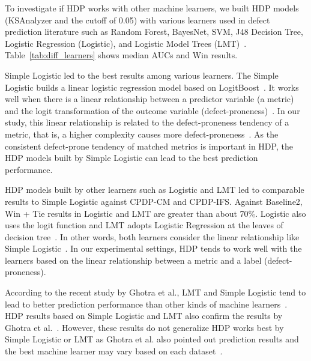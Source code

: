 To investigate if
HDP works with other machine learners, we built HDP models (KSAnalyzer and
the cutoff of 0.05) with various learners used in defect prediction
literature such as Random Forest, BayesNet, SVM, J48 Decision
Tree, Logistic Regression (Logistic),
and Logistic Model Trees
(LMT)~\cite{DAmbros12,Ghotra15,Lee11,Lessmann08,Nam13,Song11,Ghotra15}.
Table~\ref{tab:diff_learners} shows median AUCs and Win results.

Simple Logistic led to the best results among various
learners. The Simple Logistic builds a linear logistic regression model based on LogitBoost~\cite{Landwehr2005}. It works well when there is a linear
relationship between a predictor variable (a metric) and the logit
transformation of the outcome variable (defect-proneness)~\cite{Landwehr2005,Logstic}.
In our study, this linear relationship is related to the defect-proneness tendency of
a metric, that is, a higher complexity causes more defect-proneness~\cite{DAmbros12,Menzies07,Rahman13}.
As the consistent defect-prone tendency of matched metrics is important in HDP, the
HDP models built by Simple Logistic can lead to the best prediction
performance.

HDP models built by other learners such as
Logistic and LMT led to comparable results to Simple Logistic against
CPDP-CM and CPDP-IFS. Against Baseline2, Win + Tie results in
Logistic and LMT are greater than about 70\%.
Logistic also uses the logit function and LMT adopts Logistic
Regression at the leaves of decision tree~\cite{Ghotra15}. In other words, both
learners consider the linear relationship like Simple Logistic~\cite{Landwehr2005,Logstic}. In our experimental settings, HDP tends to
work well with the learners based on the linear relationship between a metric
and a label (defect-proneness).

According to the recent study by Ghotra et al., LMT and Simple Logistic tend to lead to better prediction performance than other kinds of machine learners~\cite{Ghotra15}. HDP results based on Simple Logistic and LMT also confirm the results by Ghotra et al.~\cite{Ghotra15}. However, these results do not generalize HDP works best by Simple Logistic or LMT as Ghotra et al. also pointed out prediction results and the best machine learner may vary based on each dataset~\cite{Ghotra15}.

